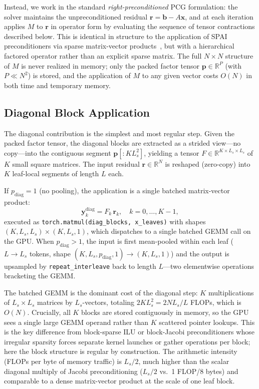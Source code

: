 \documentclass[acmtog,anonymous,review]{acmart}
\begin{document}
Instead, we work in the standard \emph{right-preconditioned} PCG formulation: the solver
maintains the unpreconditioned residual $\mathbf{r} = \mathbf{b} - A\mathbf{x}$, and at each
iteration applies $M$ to $\mathbf{r}$ in operator form by evaluating the sequence of tensor
contractions described below.  This is identical in structure to the application of SPAI
preconditioners via sparse matrix-vector products~\cite{yang2025sparse}, but with a hierarchical
factored operator rather than an explicit sparse matrix.  The full $N \times N$ structure of $M$
is never realized in memory; only the packed factor tensor $\mathbf{p} \in \mathbb{R}^P$ (with
$P \ll N^2$) is stored, and the application of $M$ to any given vector costs $O(N)$ in both time
and temporary memory.

\subsection{Diagonal Block Application}
\label{sec:application:diag}

The diagonal contribution is the simplest and most regular step.  Given the packed factor tensor,
the diagonal blocks are extracted as a strided view---no copy---into the contiguous segment
$\mathbf{p}[:K L_s^2]$, yielding a tensor $F \in \mathbb{R}^{K \times L_s \times L_s}$ of
$K$ small square matrices.  The input residual $\mathbf{r} \in \mathbb{R}^N$ is reshaped
(zero-copy) into $K$ leaf-local segments of length $L$ each.

If $p_\mathrm{diag} = 1$ (no pooling), the application is a single batched matrix-vector product:
\begin{equation}
  \mathbf{y}_k^\mathrm{diag} = F_k \, \mathbf{r}_k, \quad k = 0, \ldots, K-1,
  \label{eq:diag_apply}
\end{equation}
executed as \texttt{torch.matmul(diag\_blocks, x\_leaves)} with shapes
$(K, L_s, L_s) \times (K, L_s, 1)$, which dispatches to a single batched GEMM call on the GPU.
When $p_\mathrm{diag} > 1$, the input is first mean-pooled within each leaf
($L \to L_s$ tokens, shape $(K, L_s, p_\mathrm{diag}, 1) \to (K, L_s, 1)$) and the output is
upsampled by \texttt{repeat\_interleave} back to length $L$---two elementwise operations
bracketing the GEMM.

The batched GEMM is the dominant cost of the diagonal step: $K$ multiplications of $L_s \times
L_s$ matrices by $L_s$-vectors, totaling $2 K L_s^2 = 2 N L_s / L$ FLOPs, which is $O(N)$.
Crucially, all $K$ blocks are stored contiguously in memory, so the GPU sees a single large GEMM
operand rather than $K$ scattered pointer lookups.  This is the key difference from block-sparse
ILU or block-Jacobi preconditioners whose irregular sparsity forces separate kernel launches or
gather operations per block; here the block structure is regular by construction.  The arithmetic
intensity (FLOPs per byte of memory traffic) is $L_s / 2$, much higher than the scalar diagonal
multiply of Jacobi preconditioning ($L_s / 2$ vs.\ 1 FLOP/8 bytes) and comparable to a dense
matrix-vector product at the scale of one leaf block.
\end{document}
